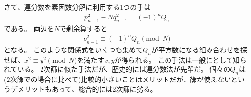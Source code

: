 
さて、連分数を素因数分解に利用する1つの手は
\begin{align*}
p_{n-1}^2 - N q_{n-1}^2 = (-1)^n Q_n
\end{align*}
である。
両辺を$N$で剰余算すると
\begin{align*}
p_{n-1}^2 \equiv (-1)^n Q_n \pmod{N}
\end{align*}
となる。
このような関係式をいくつも集めて$Q_n$が平方数になる組み合わせを探せば、$x^2\equiv y^2\pmod{N}$を満たす$x,y$が得られる。
この手法は一般にとして知られている。
2次篩に似た手法だが、歴史的には連分数法が先輩だ。
個々の$Q_n$は(2次篩での場合に比べて)比較的小さいことはメリットだが、篩が使えないというデメリットもあって、総合的には2次篩に劣る。
